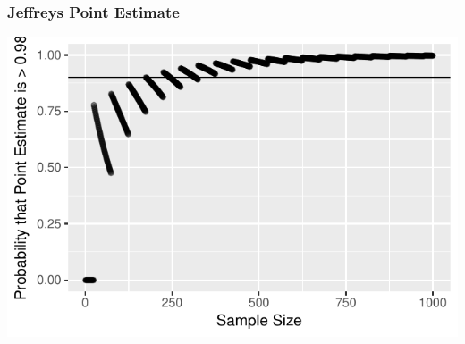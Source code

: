 \documentclass{beamer}\usepackage{knitr}
\begin{document}
% 
% 
% 


\begin{frame}
\frametitle{Jeffreys Point Estimate}
\begin{knitrout}
\color{fgcolor}

{\centering \includegraphics[width=\linewidth]{figure/plot_Jeffreys_1-1} 

}



\end{knitrout}
\end{frame}
\end{document}
